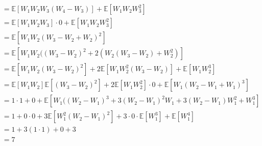 \documentclass[a4paper,11pt,notitlepage,fullpage]{article}
\newcommand{\E}{\mathbb{E}}
\begin{document}
\begin{enumerate}
\begin{align*}
&= \E[W_1W_2W_3(W_4-W_3)] + \E[W_1W_2W_3^2]  \\
&= \E[W_1W_2W_3] \cdot 0 + \E[W_1W_2W_3^2]  \\
&= \E[W_1W_2(W_3 - W_2 + W_2)^2] \\
&= \E[W_1W_2((W_3-W_2)^2 + 2(W_2(W_3-W_2) + W_2^2)]  \\
&= \E[W_1W_2(W_3-W_2)^2] + 2\E[W_1W_2^2(W_3-W_2)] + \E[W_1W_2^3]  \\
&= \E[W_1W_2]\E[(W_3-W_2)^2] + 2\E[W_1W_2^2] \cdot 0 + \E[W_1(W_2-W_1+W_1)^3] \\
&= 1 \cdot 1 + 0 + \E[W_1((W_2 - W_1)^3 + 3(W_2 - W_1)^2W_1 + 3(W_2 - W_1)W_1^2 + W_1^3] \\
&= 1 + 0 \cdot 0 + 3\E[W_1^2 (W_2-W_1)^2] + 3 \cdot 0 \cdot \E[W_1^3] + \E[W_1^4] \\
&= 1 + 3(1 \cdot 1) + 0 + 3 \\
&= 7
\end{align*}


\end{enumerate}
\end{document}
